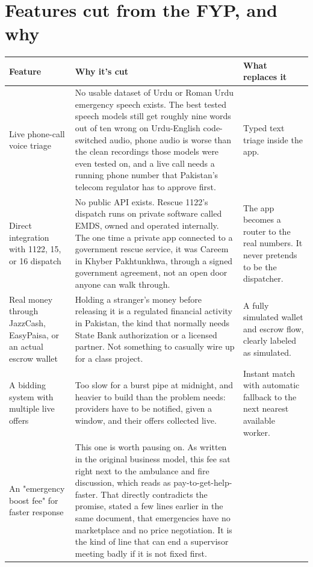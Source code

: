 \documentclass[11pt,a4paper]{article}
\begin{document}
\section{Features cut from the FYP, and why}

\begin{longtable}{p{} p{} p{}}
\toprule
\textbf{Feature} & \textbf{Why it's cut} & \textbf{What replaces it} \\
\midrule
\endhead
Live phone-call voice triage &
No usable dataset of Urdu or Roman Urdu emergency speech exists. The best tested speech models still get roughly nine words out of ten wrong on Urdu-English code-switched audio, phone audio is worse than the clean recordings those models were even tested on, and a live call needs a running phone number that Pakistan's telecom regulator has to approve first. &
Typed text triage inside the app. \\
\addlinespace
Direct integration with 1122, 15, or 16 dispatch &
No public API exists. Rescue 1122's dispatch runs on private software called EMDS, owned and operated internally. The one time a private app connected to a government rescue service, it was Careem in Khyber Pakhtunkhwa, through a signed government agreement, not an open door anyone can walk through. &
The app becomes a router to the real numbers. It never pretends to be the dispatcher. \\
\addlinespace
Real money through JazzCash, EasyPaisa, or an actual escrow wallet &
Holding a stranger's money before releasing it is a regulated financial activity in Pakistan, the kind that normally needs State Bank authorization or a licensed partner. Not something to casually wire up for a class project. &
A fully simulated wallet and escrow flow, clearly labeled as simulated. \\
\addlinespace
A bidding system with multiple live offers &
Too slow for a burst pipe at midnight, and heavier to build than the problem needs: providers have to be notified, given a window, and their offers collected live. &
Instant match with automatic fallback to the next nearest available worker. \\
\addlinespace
An "emergency boost fee" for faster response &
This one is worth pausing on. As written in the original business model, this fee sat right next to the ambulance and fire discussion, which reads as pay-to-get-help-faster. That directly contradicts the promise, stated a few lines earlier in the same document, that emergencies have no marketplace and no price negotiation. It is the kind of line that can end a supervisor meeting badly if it is not fixed first. &

\end{longtable}
\end{document}
